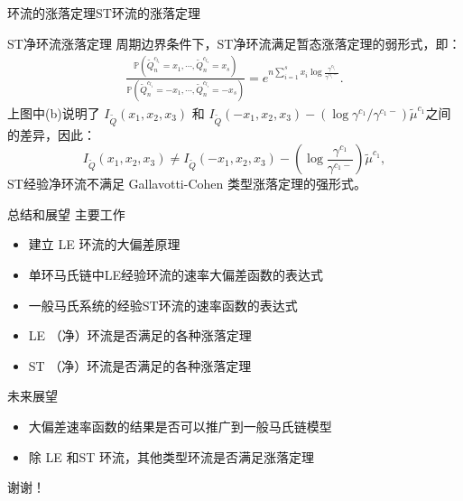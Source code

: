 \documentclass{beamer}
\newcommand{\Pnum}{\mathbb{P}}
\begin{document}
\begin{frame}{环流的涨落定理}{ST环流的涨落定理}
	\begin{block}{ST净环流涨落定理}
		周期边界条件下，ST净环流满足暂态涨落定理的弱形式，即：
		\begin{equation*}\label{weak2}
			\begin{split}
				\frac{\Pnum\left(\tilde{Q}^{c_{l_1}}_n=x_1,\cdots, \tilde{Q}^{c_{l_s}}_n=x_{s}\right)}
				{\Pnum\left(\tilde{Q}^{c_{l_1}}_n=-x_1,\cdots, \tilde{Q}^{c_{l_s}}_n=-x_{s}\right)}
				=e^{n\sum_{i=1}^{s}x_i\log\frac{\gamma^{c_{l_i}}}{\gamma^{c_{l_i}-}}}.
			\end{split}
		\end{equation*}
		上图中(b)说明了 $I_{\tilde{Q}}(x_1, x_2, x_3)$ 和 $ I_{\tilde{Q}}(-x_1, x_2, x_3) -\left(\log \gamma^{c_1} / \gamma^{c_1-}\right)\tilde{\mu}^{c_1}$之间的差异，因此：
		\begin{equation*}
			I_{\tilde{Q}}(x_1, x_2, x_3) \neq I_{\tilde{Q}}(-x_1, x_2, x_3) -\left(\log\frac{\gamma^{c_1}}{\gamma^{c_1-}}\right)\tilde{\mu}^{c_1},
		\end{equation*}
		ST经验净环流不满足 Gallavotti-Cohen 类型涨落定理的强形式。
	\end{block}
\end{frame}

\begin{frame}{总结和展望}
	主要工作
	\begin{itemize}
		\item 建立 LE 环流的大偏差原理
		\item 单环马氏链中LE经验环流的速率大偏差函数的表达式
		\item 一般马氏系统的经验ST环流的速率函数的表达式
		\item LE （净）环流是否满足的各种涨落定理
		\item ST （净）环流是否满足的各种涨落定理
	\end{itemize}
	未来展望
	\begin{itemize}
		\item 大偏差速率函数的结果是否可以推广到一般马氏链模型
		\item 除 LE 和ST 环流，其他类型环流是否满足涨落定理
	\end{itemize}
\end{frame}


\begin{frame}
	\begin{center}
		\Huge 谢谢！
	\end{center}
\end{frame}
\end{document}
